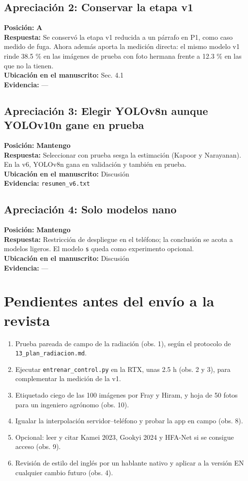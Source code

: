 \documentclass[11pt,a4paper]{article}
\begin{document}
\subsection*{Apreciación 2: Conservar la etapa v1}
\noindent\textbf{Posición:} \textbf{A}\\
\textbf{Respuesta:} Se conservó la etapa v1 reducida a un párrafo en P1, como caso medido de fuga. Ahora además aporta la medición directa: el mismo modelo v1 rinde 38.5 \% en las imágenes de prueba con foto hermana frente a 12.3 \% en las que no la tienen.\\
\textbf{Ubicación en el manuscrito:} Sec. 4.1\\
\textbf{Evidencia:} —

\subsection*{Apreciación 3: Elegir YOLOv8n aunque YOLOv10n gane en prueba}
\noindent\textbf{Posición:} \textbf{Mantengo}\\
\textbf{Respuesta:} Seleccionar con prueba sesga la estimación (Kapoor y Narayanan). En la v6, YOLOv8n gana en validación y también en prueba.\\
\textbf{Ubicación en el manuscrito:} Discusión\\
\textbf{Evidencia:} \texttt{resumen\_v6.txt}

\subsection*{Apreciación 4: Solo modelos nano}
\noindent\textbf{Posición:} \textbf{Mantengo}\\
\textbf{Respuesta:} Restricción de despliegue en el teléfono; la conclusión se acota a modelos ligeros. El modelo \texttt{s} queda como experimento opcional.\\
\textbf{Ubicación en el manuscrito:} Discusión\\
\textbf{Evidencia:} —

\section*{Pendientes antes del envío a la revista}
\begin{enumerate}
\item Prueba pareada de campo de la radiación (obs. 1), según el protocolo de \texttt{13\_plan\_radiacion.md}.
\item Ejecutar \texttt{entrenar\_control.py} en la RTX, unas 2.5 h (obs. 2 y 3), para complementar la medición de la v1.
\item Etiquetado ciego de las 100 imágenes por Fray y Hiram, y hoja de 50 fotos para un ingeniero agrónomo (obs. 10).
\item Igualar la interpolación servidor–teléfono y probar la app en campo (obs. 8).
\item Opcional: leer y citar Kamei 2023, Gookyi 2024 y HFA-Net si se consigue acceso (obs. 9).
\item Revisión de estilo del inglés por un hablante nativo y aplicar a la versión EN cualquier cambio futuro (obs. 4).
\end{enumerate}
\end{document}
